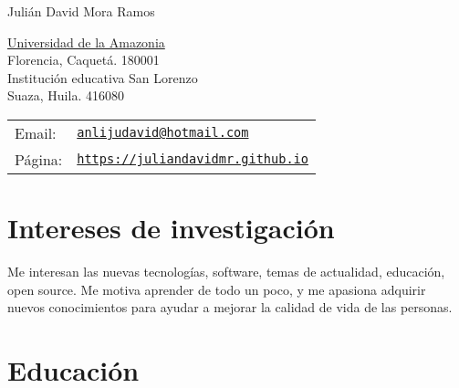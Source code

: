 \documentclass[letterpaper]{article}
\def\name{Juli\'an David Mora Ramos}
\renewenvironment{itemize}{
  \begin{list}{}{
    \setlength{\leftmargin}{1.5em}
  }
}{
  \end{list}
}
\begin{document}
{\huge \name}


\vspace{0.25in}

\begin{minipage}{0.45\linewidth}
	\href{http://www.udla.edu.co}{Universidad de la Amazonia} \\
	Florencia, Caquet\'a. 180001\\
	Instituci\'on educativa San Lorenzo \\
	Suaza, Huila. 416080 \\
 
\end{minipage}
\begin{minipage}{0.45\linewidth}
  \begin{tabular}{ll}
    Email: & \href{mailto:anlijudavid@hotmail.com}{\tt anlijudavid@hotmail.com} \\
    P\'agina: & \href{https://juliandavidmr.github.io}{\tt https://juliandavidmr.github.io} \\
  \end{tabular}
\end{minipage}

\section*{Intereses de investigaci\'on}
\begin{itemize}
\item Me interesan las nuevas tecnolog\'ias, software, temas de actualidad, educaci\'on, open source. Me motiva aprender de todo un poco, y me apasiona adquirir nuevos conocimientos para ayudar a mejorar la calidad de vida de las personas.
\end{itemize} 

\section*{Educaci\'on}
\end{document}
